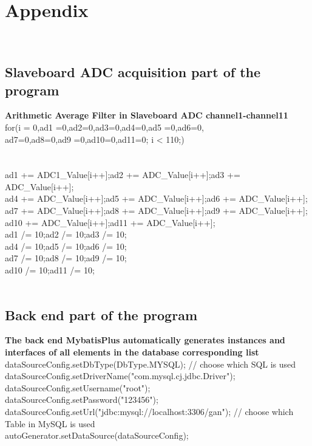 \chapter{Appendix}
\label{chap:Appendix}
\\
\section{Slaveboard ADC acquisition part of the program}
\label{sec:Slaveboard ADC acquisition part of the program}
\textbf{Arithmetic Average Filter in Slaveboard ADC channel1-channel11}\\
for(i = 0,ad1 =0,ad2=0,ad3=0,ad4=0,ad5 =0,ad6=0,\\ad7=0,ad8=0,ad9 =0,ad10=0,ad11=0; i < 110;)
\\
\\{
\\ad1 += ADC1_Value[i++];ad2 += ADC_Value[i++];ad3 += ADC_Value[i++];
\\ad4 += ADC_Value[i++];ad5 += ADC_Value[i++];ad6 += ADC_Value[i++];
\\ad7 += ADC_Value[i++];ad8 += ADC_Value[i++];ad9 += ADC_Value[i++];
\\ad10 += ADC_Value[i++];ad11 += ADC_Value[i++];} 
\\ad1 /= 10;ad2 /= 10;ad3 /= 10;
\\ad4 /= 10;ad5 /= 10;ad6 /= 10;
\\ad7 /= 10;ad8 /= 10;ad9 /= 10;
\\ad10 /= 10;ad11 /= 10;
\\
\\
\section{Back end part of the program}
\label{sec:Back end part of the program}
\textbf{The back end MybatisPlus automatically generates instances and interfaces of all elements in the database corresponding list}
\\
        dataSourceConfig.setDbType(DbType.MYSQL);        // choose which SQL is used 
      \\
        dataSourceConfig.setDriverName("com.mysql.cj.jdbc.Driver");
       \\
        dataSourceConfig.setUsername("root");
       \\ dataSourceConfig.setPassword("123456"); 
        \\dataSourceConfig.setUrl("jdbc:mysql://localhost:3306/gan");  // choose which Table in MySQL is used 
        \\
        autoGenerator.setDataSource(dataSourceConfig);

